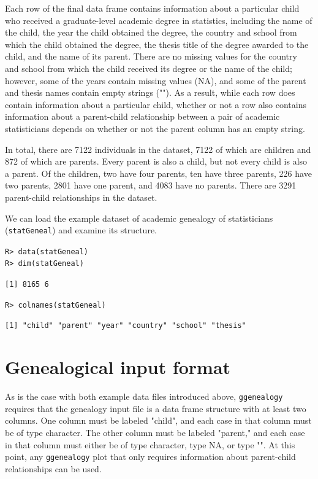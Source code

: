 \documentclass[11pt,a4paper,oldfontcommands,openany]{memoir}
\DeclareRobustCommand{\mybox}[2][gray!15]{%
\begin{tcolorbox}[   %
        breakable,
        left=0pt,
        right=0pt,
        top=0pt,
        bottom=0pt,
        colback=#1,
        colframe=#1,
        width=\dimexpr\textwidth\relax, 
        enlarge left by=0mm,
        boxsep=5pt,
        arc=0pt,outer arc=0pt,
        ]
        #2
\end{tcolorbox}
}
\numberwithin{equation}{section} %
\newcommand{\code}[1]{{\texttt{#1}}}
\newcommand{\pkg}[1]{{\texttt{#1}}}
\begin{document}
Each row of the final data frame contains information about a particular child who received a graduate-level academic degree in statistics, including the name of the child, the year the child obtained the degree, the country and school from which the child obtained the degree, the thesis title of the degree awarded to the child, and the name of its parent. There are no missing values for the country and school from which the child received its degree or the name of the child; however, some of the years contain missing values (NA), and some of the parent and thesis names contain empty strings (""). As a result, while each row does contain information about a particular child, whether or not a row also contains information about a parent-child relationship between a pair of academic statisticians depends on whether or not the parent column has an empty string.
 
In total, there are 7122 individuals in the dataset, 7122 of which are children and 872 of which are parents. Every parent is also a child, but not every child is also a parent. Of the children, two have four parents, ten have three parents, 226 have two parents, 2801 have one parent, and 4083 have no parents. There are 3291 parent-child relationships in the dataset.

We can load the example dataset of academic genealogy of statisticians (\code{statGeneal}) and examine its structure. 

\mybox{
\texttt{R> data(statGeneal)}\\
\texttt{R> dim(statGeneal)}
}

\mybox[green!10]{
\texttt{[1] 8165    6}
}

\mybox{
\texttt{R> colnames(statGeneal)}
}

\mybox[green!10]{
\texttt{[1] "child"   "parent"  "year"    "country" "school"  "thesis"}
}

\section{Genealogical input format}

As is the case with both example data files introduced above, \pkg{ggenealogy} requires that the genealogy input file is a data frame structure with at least two columns. One column must be labeled "child", and each case in that column must be of type character. The other column must be labeled "parent," and each case in that column must either be of type character, type NA, or type "". At this point, any \pkg{ggenealogy} plot that only requires information about parent-child relationships can be used.
\end{document}
